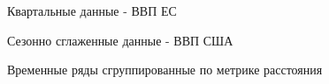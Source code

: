 \documentclass[12pt,a4paper, oneside]{extreport}
\begin{document}
\begin{figure}[H]
	\caption{Временные ряды сгруппированные по метрике расстояния}
	\label{otkl_14}
	
	\centering\footnotesize{Квартальные данные - ВВП ЕС  }
	
	\begin{minipage}[H]{0.4\linewidth}
	\end{minipage}
	
	
	\centering\footnotesize{Сезонно сглаженные данные - ВВП США}
	

\end{figure}
\end{document}
